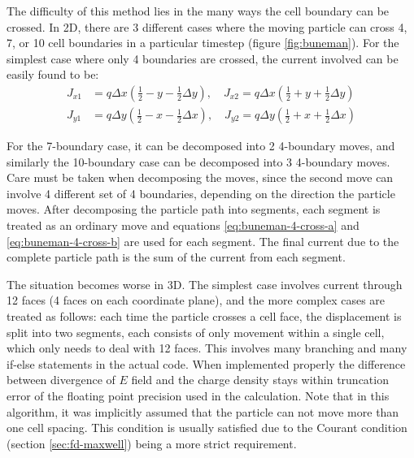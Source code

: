 The difficulty of this method lies in the many ways the cell boundary can be
crossed. In 2D, there are 3 different cases where the moving particle can cross
4, 7, or 10 cell boundaries in a particular timestep (figure \ref{fig:buneman}).
For the simplest case where only 4 boundaries are crossed, the current involved
can be easily found to be:
\begin{align}
  \label{eq:buneman-4-cross-a}
  J_{x1} &= q\Delta x \left( \frac{1}{2} - y - \frac{1}{2}\Delta y \right) ,\quad J_{x2} = q\Delta x \left( \frac{1}{2} + y + \frac{1}{2}\Delta y \right) \\
  \label{eq:buneman-4-cross-b}
  J_{y1} &= q\Delta y \left( \frac{1}{2} - x - \frac{1}{2}\Delta x \right) ,\quad J_{y2} = q\Delta y \left( \frac{1}{2} + x + \frac{1}{2}\Delta x \right)
\end{align}

For the 7-boundary case, it can be decomposed into 2 4-boundary moves, and
similarly the 10-boundary case can be decomposed into 3 4-boundary moves. Care
must be taken when decomposing the moves, since the second move can involve 4
different set of 4 boundaries, depending on the direction the particle moves.
After decomposing the particle path into segments, each segment is treated as an
ordinary move and equations \eqref{eq:buneman-4-cross-a} and
\eqref{eq:buneman-4-cross-b} are used for each segment. The final current due to
the complete particle path is the sum of the current from each segment.

The situation becomes worse in 3D. The simplest case involves current through 12
faces (4 faces on each coordinate plane), and the more complex cases are treated
as follows: each time the particle crosses a cell face, the displacement is
split into two segments, each consists of only movement within a single cell,
which only needs to deal with 12 faces. This involves many branching and many
if-else statements in the actual code. When implemented properly
the difference between divergence of $E$ field and the charge density stays
within truncation error of the floating point precision used in the calculation.
Note that in this algorithm, it was implicitly assumed that the particle can not
move more than one cell spacing. This condition is usually satisfied due to the
Courant condition (section \ref{sec:fd-maxwell}) being a more strict
requirement.


